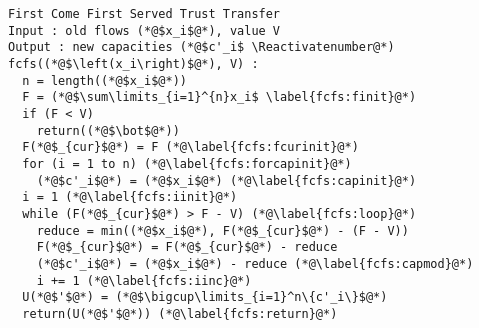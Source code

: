 \Suppressnumber
\begin{lstlisting}[label=fcfs, style=numbers]
First Come First Served Trust Transfer
Input : old flows (*@$x_i$@*), value V
Output : new capacities (*@$c'_i$ \Reactivatenumber@*)
fcfs((*@$\left(x_i\right)$@*), V) :
  n = length((*@$x_i$@*))
  F = (*@$\sum\limits_{i=1}^{n}x_i$ \label{fcfs:finit}@*)
  if (F < V)
    return((*@$\bot$@*))
  F(*@$_{cur}$@*) = F (*@\label{fcfs:fcurinit}@*)
  for (i = 1 to n) (*@\label{fcfs:forcapinit}@*)
    (*@$c'_i$@*) = (*@$x_i$@*) (*@\label{fcfs:capinit}@*)
  i = 1 (*@\label{fcfs:iinit}@*)
  while (F(*@$_{cur}$@*) > F - V) (*@\label{fcfs:loop}@*)
    reduce = min((*@$x_i$@*), F(*@$_{cur}$@*) - (F - V))
    F(*@$_{cur}$@*) = F(*@$_{cur}$@*) - reduce
    (*@$c'_i$@*) = (*@$x_i$@*) - reduce (*@\label{fcfs:capmod}@*)
    i += 1 (*@\label{fcfs:iinc}@*)
  U(*@$'$@*) = (*@$\bigcup\limits_{i=1}^n\{c'_i\}$@*)
  return(U(*@$'$@*)) (*@\label{fcfs:return}@*)
\end{lstlisting}
